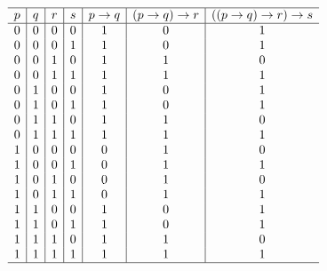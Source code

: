 {{        %
        \begin{practices}
            \begin{table}[H]
                \[
                    \begin{array}{c|c|c|c|c|c|c}
                        \hline
                        p & q & r & s & p \rightarrow q & (p \rightarrow q) \rightarrow r & ((p \rightarrow q) \rightarrow r) \rightarrow s \\
                        \hline
                        0 & 0 & 0 & 0 & 1 & 0 & 1 \\
                        0 & 0 & 0 & 1 & 1 & 0 & 1 \\
                        0 & 0 & 1 & 0 & 1 & 1 & 0 \\
                        0 & 0 & 1 & 1 & 1 & 1 & 1 \\
                        0 & 1 & 0 & 0 & 1 & 0 & 1 \\
                        0 & 1 & 0 & 1 & 1 & 0 & 1 \\
                        0 & 1 & 1 & 0 & 1 & 1 & 0 \\
                        0 & 1 & 1 & 1 & 1 & 1 & 1 \\
                        1 & 0 & 0 & 0 & 0 & 1 & 0 \\
                        1 & 0 & 0 & 1 & 0 & 1 & 1 \\
                        1 & 0 & 1 & 0 & 0 & 1 & 0 \\
                        1 & 0 & 1 & 1 & 0 & 1 & 1 \\
                        1 & 1 & 0 & 0 & 1 & 0 & 1 \\
                        1 & 1 & 0 & 1 & 1 & 0 & 1 \\
                        1 & 1 & 1 & 0 & 1 & 1 & 0 \\
                        1 & 1 & 1 & 1 & 1 & 1 & 1 \\
                        \hline
                    \end{array}
                \]
            \end{table}
        \end{practices}

}}
